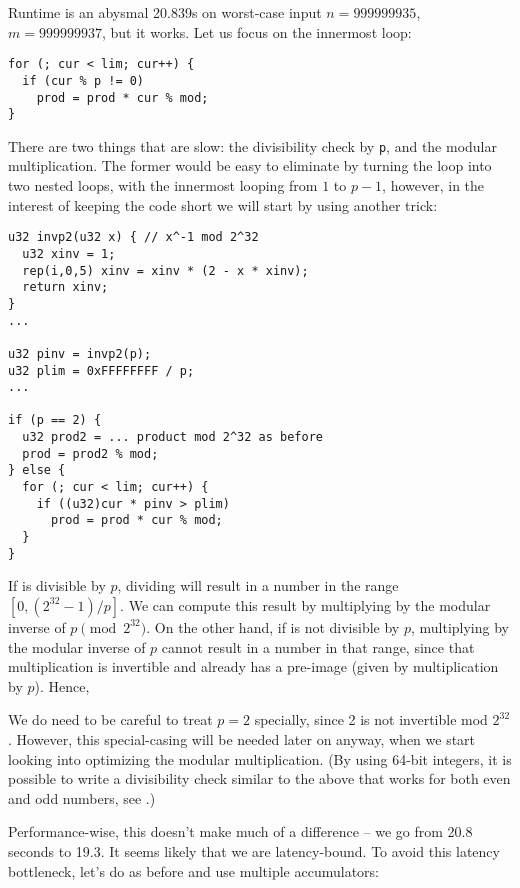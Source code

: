 Runtime is an abysmal 20.839s on worst-case input $n=999999935$, $m=999999937$, but it works.
Let us focus on the innermost loop:
\begin{lstlisting}
for (; cur < lim; cur++) {
  if (cur % p != 0)
    prod = prod * cur % mod;
}
\end{lstlisting}

There are two things that are slow: the divisibility check by \texttt{p}, and the modular multiplication.
The former would be easy to eliminate by turning the loop into two nested loops, with the innermost looping from $1$ to $p-1$, however, in the interest of keeping the code short we will start by using another trick:

\begin{lstlisting}
u32 invp2(u32 x) { // x^-1 mod 2^32
  u32 xinv = 1;
  rep(i,0,5) xinv = xinv * (2 - x * xinv);
  return xinv;
}
...

u32 pinv = invp2(p);
u32 plim = 0xFFFFFFFF / p;
...

if (p == 2) {
  u32 prod2 = ... product mod 2^32 as before
  prod = prod2 % mod;
} else {
  for (; cur < lim; cur++) {
    if ((u32)cur * pinv > plim)
      prod = prod * cur % mod;
  }
}
\end{lstlisting}

If \verb@cur@ is divisible by $p$, dividing will result in a number in the range $[0, (2^{32}-1) / p]$.
We can compute this result by multiplying by the modular inverse of $p \pmod{2^{32}}$.
On the other hand, if \verb@cur@ is not divisible by $p$, multiplying by the modular inverse of $p$ cannot result in a number in that range, since that multiplication is invertible and already has a pre-image (given by multiplication by $p$).
Hence, \verb@cur % p == 0@ can be replaced by \verb@(u32)cur * pinv <= plim@, multiplication being a much cheaper operation than modulo.

We do need to be careful to treat $p = 2$ specially, since 2 is not invertible mod $2^{32}$.
However, this special-casing will be needed later on anyway, when we start looking into optimizing the modular multiplication.
(By using 64-bit integers, it is possible to write a divisibility check similar to the above that works for both even and odd numbers, see \cite{fastdivcheck}.)

Performance-wise, this doesn't make much of a difference -- we go from 20.8 seconds to 19.3.
It seems likely that we are latency-bound.
To avoid this latency bottleneck, let's do as before and use multiple accumulators:

